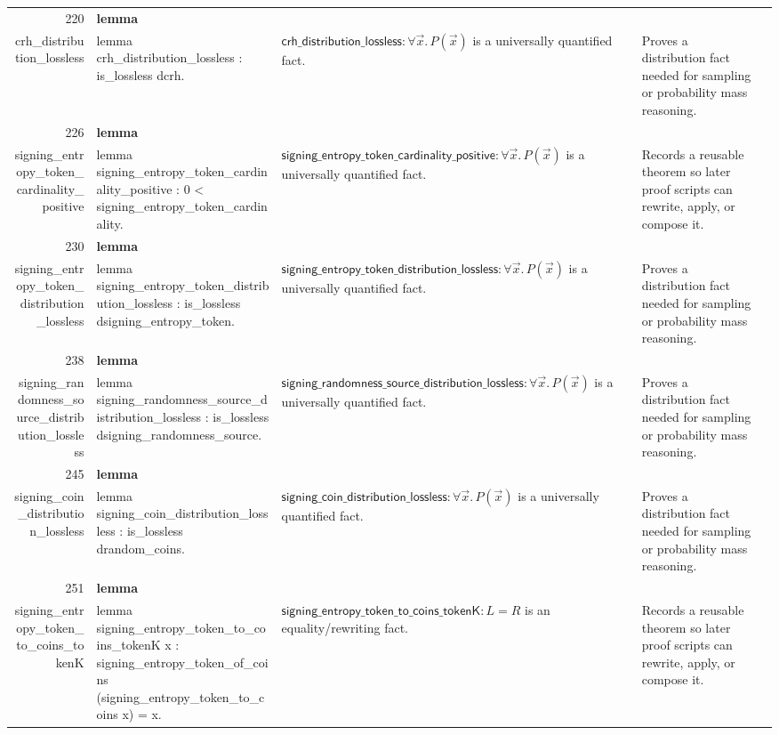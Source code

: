 \documentclass[10pt]{article}
\newcommand{\ec}[1]{\begingroup\ttfamily\scriptsize #1\endgroup}
\begin{document}
\begin{longtable}{r L{0.17\textwidth} L{0.26\textwidth} L{0.27\textwidth} L{0.20\textwidth}}
220 & \textbf{lemma}\\\ec{crh\_distribution\_lossless} & \ec{lemma crh\_distribution\_lossless : is\_lossless dcrh.} & \(\mathsf{crh\_distribution\_lossless} : \forall \vec{x}.\, P(\vec{x})\) is a universally quantified fact. & Proves a distribution fact needed for sampling or probability mass reasoning. \\
226 & \textbf{lemma}\\\ec{signing\_entropy\_token\_cardinality\_positive} & \ec{lemma signing\_entropy\_token\_cardinality\_positive : 0 < signing\_entropy\_token\_cardinality.} & \(\mathsf{signing\_entropy\_token\_cardinality\_positive} : \forall \vec{x}.\, P(\vec{x})\) is a universally quantified fact. & Records a reusable theorem so later proof scripts can rewrite, apply, or compose it. \\
230 & \textbf{lemma}\\\ec{signing\_entropy\_token\_distribution\_lossless} & \ec{lemma signing\_entropy\_token\_distribution\_lossless : is\_lossless dsigning\_entropy\_token.} & \(\mathsf{signing\_entropy\_token\_distribution\_lossless} : \forall \vec{x}.\, P(\vec{x})\) is a universally quantified fact. & Proves a distribution fact needed for sampling or probability mass reasoning. \\
238 & \textbf{lemma}\\\ec{signing\_randomness\_source\_distribution\_lossless} & \ec{lemma signing\_randomness\_source\_distribution\_lossless : is\_lossless dsigning\_randomness\_source.} & \(\mathsf{signing\_randomness\_source\_distribution\_lossless} : \forall \vec{x}.\, P(\vec{x})\) is a universally quantified fact. & Proves a distribution fact needed for sampling or probability mass reasoning. \\
245 & \textbf{lemma}\\\ec{signing\_coin\_distribution\_lossless} & \ec{lemma signing\_coin\_distribution\_lossless : is\_lossless drandom\_coins.} & \(\mathsf{signing\_coin\_distribution\_lossless} : \forall \vec{x}.\, P(\vec{x})\) is a universally quantified fact. & Proves a distribution fact needed for sampling or probability mass reasoning. \\
251 & \textbf{lemma}\\\ec{signing\_entropy\_token\_to\_coins\_tokenK} & \ec{lemma signing\_entropy\_token\_to\_coins\_tokenK x : signing\_entropy\_token\_of\_coins (signing\_entropy\_token\_to\_coins x) = x.} & \(\mathsf{signing\_entropy\_token\_to\_coins\_tokenK} : L = R\) is an equality/rewriting fact. & Records a reusable theorem so later proof scripts can rewrite, apply, or compose it. \\

\end{longtable}
\end{document}
